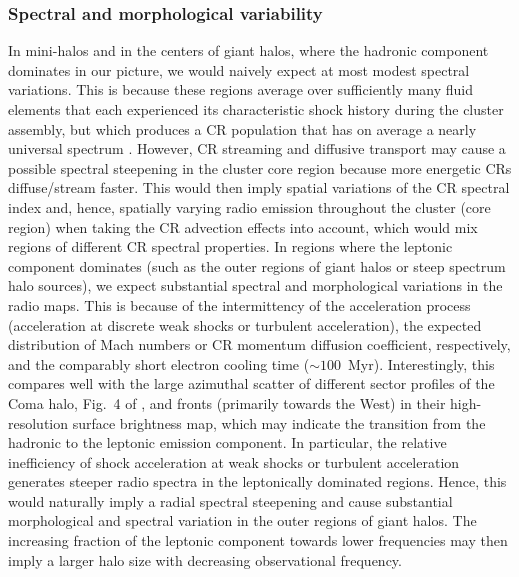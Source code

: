 \documentclass[useAMS,usenatbib]{mn2e}
\begin{document}
\subsubsection{Spectral and morphological variability}
  In mini-halos and in the
  centers of giant halos, where the hadronic component dominates in our picture,
  we would naively expect at most modest spectral variations. This is because
  these regions average over sufficiently many fluid elements that each
  experienced its characteristic shock history during the cluster assembly, but
  which produces a CR population that has on average a nearly universal spectrum
  \citep{2010MNRAS.409..449P}. However, CR streaming and diffusive transport may 
  cause a possible spectral steepening in the cluster core region because more 
  energetic CRs diffuse/stream faster. This would
  then imply spatial variations of the CR spectral index and, hence, spatially
  varying radio emission throughout the cluster (core region) when taking the CR
  advection effects into account, which would mix regions of different CR
  spectral properties. In regions where the leptonic component dominates (such
  as the outer regions of giant halos or steep spectrum halo sources), we expect
  substantial spectral and morphological variations in the radio maps. This is
  because of the intermittency of the acceleration process (acceleration at
  discrete weak shocks or turbulent acceleration), the expected distribution of
  Mach numbers or CR momentum diffusion coefficient, respectively, and the
  comparably short electron cooling time ($\sim100$~Myr). Interestingly, this
  compares well with the large azimuthal scatter of different sector profiles of
  the Coma halo, Fig.~4 of \cite{2011MNRAS.412....2B}, and fronts (primarily
  towards the West) in their high-resolution surface brightness map, which may
  indicate the transition from the hadronic to the leptonic emission
  component. In particular, the relative inefficiency of shock acceleration at
  weak shocks or turbulent acceleration generates steeper radio spectra in the
  leptonically dominated regions. Hence, this would naturally imply a radial
  spectral steepening and cause substantial morphological and spectral variation
  in the outer regions of giant halos. The increasing fraction of the leptonic
  component towards lower frequencies may then imply a larger halo size
  with decreasing observational frequency.
\end{document}
